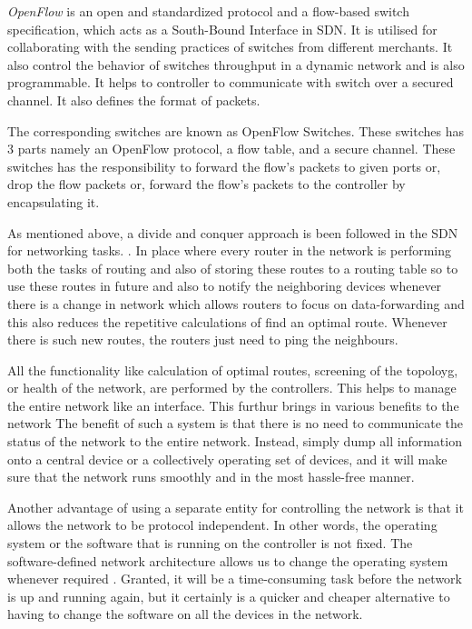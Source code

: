     \textit{OpenFlow} is an open and standardized protocol and a flow-based switch specification, which acts as a South-Bound Interface in SDN. It is utilised for collaborating with the sending practices of switches from different merchants. It also control the behavior of switches throughput in a dynamic network and is also programmable. It helps to controller to communicate with switch over a secured channel. It also defines the format of packets.
    
    The corresponding switches are known as OpenFlow Switches. These switches has 3 parts namely an OpenFlow protocol, a flow table, and a secure channel. These switches has the responsibility to forward the flow's packets to given ports or, drop the flow packets or, forward the flow's packets to the controller by encapsulating it.

    As mentioned above, a divide and conquer approach is been followed in the SDN for networking tasks. \cite{taxonomy2014}. In place where every router in the network is performing both the tasks of routing and also of storing these routes to a routing table so to use these routes in future and also to notify the neighboring devices whenever there is a change in network which allows routers to focus on data-forwarding and this also reduces the repetitive calculations of find an optimal route. Whenever there is such new routes, the routers just need to ping the neighbours.
    
    All the functionality like calculation of optimal routes, screening of the topoloyg, or health of the network, are performed by the controllers. This helps to manage the entire network like an interface. This furthur brings in various benefits to the network The benefit of such a system is that there is no need to communicate the status of the network to the entire network. Instead, simply dump all information onto a central device or a collectively operating set of devices, and it will make sure that the network runs smoothly and in the most hassle-free manner.
     
    Another advantage of using a separate entity for controlling the network is that it allows the network to be protocol independent. In other words, the operating system or the software that is running on the controller is not fixed. The software-defined network architecture allows us to change the operating system whenever required \cite{arpanet2004}. Granted, it will be a time-consuming task before the network is up and running again, but it certainly is a quicker and cheaper alternative to having to change the software on all the devices in the network.

